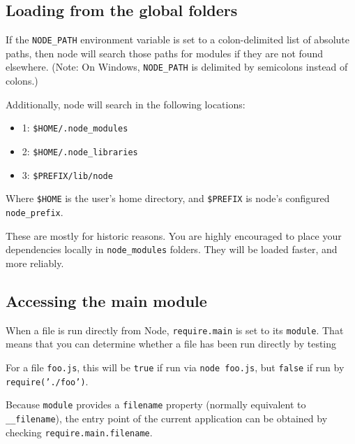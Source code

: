 \subsection{Loading from the global
folders}\label{loading-from-the-global-folders}

If the \texttt{NODE\_PATH} environment variable is set to a
colon-delimited list of absolute paths, then node will search those
paths for modules if they are not found elsewhere. (Note: On Windows,
\texttt{NODE\_PATH} is delimited by semicolons instead of colons.)

Additionally, node will search in the following locations:

\begin{itemize}
\itemsep1pt\parskip0pt
\item
  1: \texttt{\$HOME/.node\_modules}
\item
  2: \texttt{\$HOME/.node\_libraries}
\item
  3: \texttt{\$PREFIX/lib/node}
\end{itemize}

Where \texttt{\$HOME} is the user's home directory, and
\texttt{\$PREFIX} is node's configured \texttt{node\_prefix}.

These are mostly for historic reasons. You are highly encouraged to
place your dependencies locally in \texttt{node\_modules} folders. They
will be loaded faster, and more reliably.

\subsection{Accessing the main module}\label{accessing-the-main-module}

When a file is run directly from Node, \texttt{require.main} is set to
its \texttt{module}. That means that you can determine whether a file
has been run directly by testing

\begin{Shaded}
\begin{Highlighting}[]
 
\end{Highlighting}
\end{Shaded}

For a file \texttt{foo.js}, this will be \texttt{true} if run via
\texttt{node foo.js}, but \texttt{false} if run by
\texttt{require('./foo')}.

Because \texttt{module} provides a \texttt{filename} property (normally
equivalent to \texttt{\_\_filename}), the entry point of the current
application can be obtained by checking \texttt{require.main.filename}.

